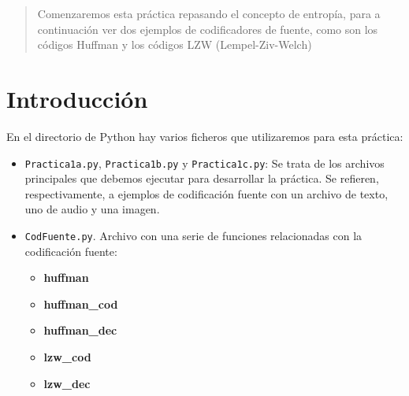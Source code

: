 \documentclass[es,practica]{uah}
\begin{document}

\maketitle

\begin{abstract}
Comenzaremos esta práctica repasando el concepto de entropía, para a continuación ver dos ejemplos de codificadores de fuente, como son los códigos Huffman y los códigos LZW (Lempel-Ziv-Welch)
\end{abstract}

\section{Introducción}

En el directorio de Python hay varios ficheros que utilizaremos para esta práctica:

\begin{itemize}
	\item \texttt{Practica1a.py}, \texttt{Practica1b.py} y \texttt{Practica1c.py}: Se trata de los archivos principales que debemos ejecutar para desarrollar la práctica. Se refieren, respectivamente, a ejemplos de codificación fuente con un archivo de texto, uno de audio y una imagen.
	\item \texttt{CodFuente.py}. Archivo con una serie de funciones relacionadas con la codificación fuente:
	\begin{itemize}
		\item {\bf huffman}
		\item {\bf huffman\_cod}
		\item {\bf huffman\_dec}
		\item {\bf lzw\_cod}
		\item {\bf lzw\_dec}
	\end{itemize}
\end{itemize}
\end{document}
